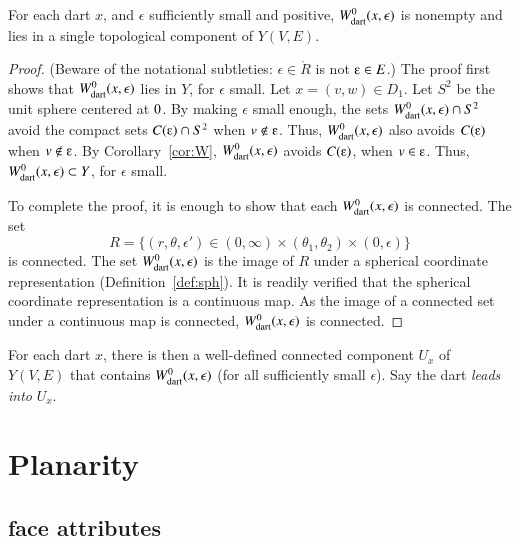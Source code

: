 \begin{lemma} 
For each dart $x$, and $\epsilon$ sufficiently small and positive,
$W^0_{\text{dart}}(x,\epsilon)$ is nonempty and lies in a single 
topological component of $Y(V,E)$.
\end{lemma}

\begin{proof}  (Beware of the notational subtleties: $\epsilon\in\ring{R}$ is not $\e\in E$.)  The proof first shows that $W^0_{\text{dart}}(x,\epsilon)$ lies in $Y$,
for $\epsilon$ small.  Let $x=(v,w)\in D_1$.  
Let $S^2$ be the unit sphere centered at $0$.
By making $\epsilon$ small enough,
the sets $W^0_{\text{dart}}(x,\epsilon)\cap S^2$
avoid the compact sets $C(\e)\cap S^2$ when $v\not\in \e$.
Thus, $W^0_{\text{dart}}(x,\epsilon)$ also avoids $C(\e)$ when $v\not\in \e$.
By Corollary~\ref{cor:W}, $W^0_{\text{dart}}(x,\epsilon)$ avoids $C(\e)$, when $v\in \e$.
Thus, $W^0_{\text{dart}}(x,\epsilon)\subset Y$, for $\epsilon$ small.

To complete the proof, it is enough to show that each $W^0_{\text{dart}}(x,\epsilon)$ is
connected.  
The  set
   $$
   R=\{(r,\theta,\epsilon') \in (0,\infty) \times (\theta_1,\theta_2) \times (0,\epsilon)\}
   $$
is connected.
The set $W^0_{\text{dart}}(x,\epsilon)$  is the image of $R$
under a spherical coordinate representation (Definition~\ref{def:sph}).
It is readily verified that the spherical coordinate representation is
a continuous map. As the image of a connected set under a continuous map
is connected, $W^0_{\text{dart}}(x,\epsilon)$ is connected.
\end{proof}

\begin{definition} For each dart $x$, 
there is then a well-defined connected
component $U_x$ of $Y(V,E)$ 
that contains $W^0_{\text{dart}}(x,\epsilon)$ (for all
sufficiently small $\epsilon$). Say the dart {\it leads into}
$U_x$.
\end{definition}


\section{Planarity}


\subsection{face attributes}


